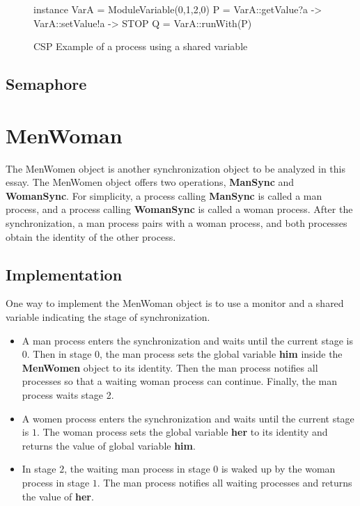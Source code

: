 \documentclass{article}
\begin{document}
\begin{figure}[hbtp]
\begin{cspm}
instance VarA = ModuleVariable({0,1,2},0)
P = VarA::getValue?a -> VarA::setValue!a -> STOP
Q = VarA::runWith(P)
\end{cspm}
\caption{CSP Example of a process using a shared variable}
\label{globalvar.csp.example}
\end{figure}


\subsection{Semaphore}


\section{MenWoman}
The MenWomen object is another synchronization object to be analyzed in this essay. The MenWomen object offers two operations, \textbf{ManSync} and \textbf{WomanSync}. For simplicity, a process calling \textbf{ManSync} is called a man process, and a process calling \textbf{WomanSync} is called a woman process. After the synchronization, a man process pairs with a woman process, and both processes obtain the identity of the other process.

\subsection{Implementation}
One way to implement the MenWoman object is to use a monitor and a shared variable indicating the stage of synchronization. 
\begin{itemize}
  \item A man process enters the synchronization and waits until the current stage is $0$. Then in stage $0$, the man process sets the global variable \textbf{him} inside the \textbf{MenWomen} object to its identity. Then the man process notifies all processes so that a waiting woman process can continue. Finally, the man process waits stage 2.
  \item A women process enters the synchronization and waits until the current stage is $1$. The woman process sets the global variable \textbf{her} to its identity and returns the value of global variable \textbf{him}.
  \item In stage $2$, the waiting man process in stage $0$ is waked up by the woman process in stage $1$. The man process notifies all waiting processes and returns the value of \textbf{her}.
\end{itemize}
\end{document}
